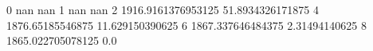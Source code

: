 0 nan nan
1 nan nan
2 1916.9161376953125 51.8934326171875
4 1876.65185546875 11.629150390625
6 1867.337646484375 2.31494140625
8 1865.022705078125 0.0
